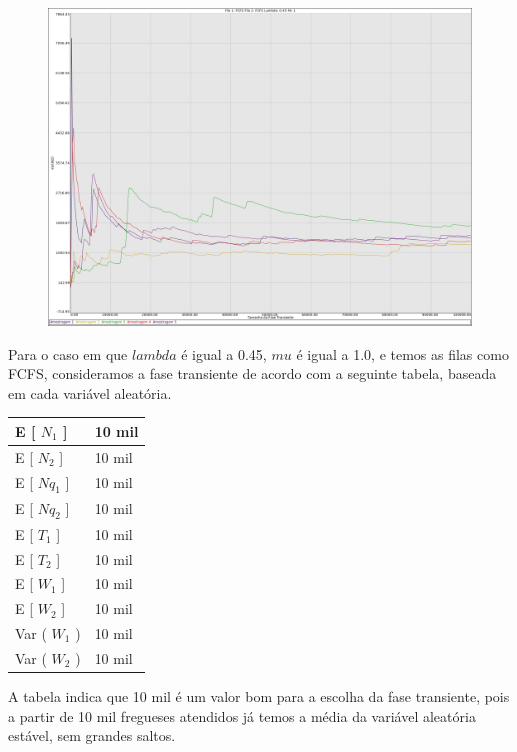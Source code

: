 \documentclass[a4paper,10pt]{article}
\begin{document}
\pagebreak

\begin{figure}
\includegraphics[scale = 0.2]{./graficos_transiente_1/FCFS/10.png}
\end{figure}

    Para o caso em que $lambda$ é igual a 0.45, $mu$ é igual a 1.0, e temos as filas como FCFS, consideramos a fase transiente de acordo com a seguinte tabela, baseada em cada variável aleatória.

\begin{center}
\begin{tabular} { | l | l | }
    \hline
    E [ $N_1$ ]  & 10 mil \\ \hline
    E [ $N_2$ ] & 10 mil \\ \hline
    E [ $Nq_1$ ] & 10 mil \\ \hline
    E [ $Nq_2$ ]	& 10 mil \\ \hline
    E [ $T_1$ ] & 10 mil \\ \hline
    E [ $T_2$ ] & 10 mil \\ \hline
    E [ $W_1$ ] & 10 mil \\ \hline
    E [ $W_2$ ] & 10 mil \\ \hline
    Var ( $W_1$ ) & 10 mil \\ \hline
    Var ( $W_2$ ) & 10 mil \\ \hline
    \hline
\end{tabular}
\end{center}

    A tabela indica que 10 mil é um valor bom para a escolha da fase transiente, pois a partir de 10 mil fregueses atendidos já temos a média da variável aleatória estável, sem grandes saltos.
\end{document}
